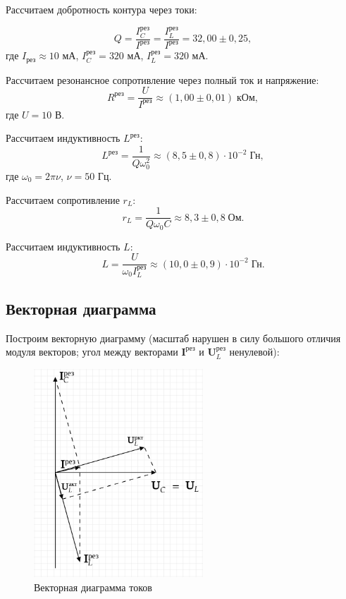 \documentclass[a4paper]{article}
\theoremstyle{definition}
\theoremstyle{remark}
\begin{document}
\noindent Рассчитаем добротность контура через токи:

$$Q = \frac{I_C^{\text{рез}}}{I^{\text{рез}}} = \frac{I_L^{\text{рез}}}{I^{\text{рез}}} = 32,00 \pm 0,25,$$ где $I_{\text{рез}} \approx 10$ мА, $I_C^{\text{рез}} = 320$ мА, $I_L^{\text{рез}} = 320$ мА. \medskip

\noindent Рассчитаем резонансное сопротивление через полный ток и напряжение: $$R^{\text{рез}} = \frac{U}{I^{\text{рез}}} \approx (1,00 \pm 0,01) \;\text{кОм},$$ где $U = 10$ В. \medskip


\noindent Рассчитаем индуктивность $L^{\text{рез}}$: $$L^{\text{рез}} = \frac{1}{Q\omega_0^2} \approx (8,5 \pm 0,8)\cdot 10^{-2} \;\text{Гн},$$ где $\omega_0 = 2\pi\nu$, $\nu = 50$ Гц. \medskip

\noindent Рассчитаем сопротивление $r_L$: $$r_L = \frac{1}{Q\omega_0 C} \approx 8,3 \pm 0,8 \;\text{Ом}.$$ \medskip

\noindent Рассчитаем индуктивность $L$: $$L = \frac{U}{\omega_0 I^{\text{рез}}_L} \approx (10,0 \pm 0,9) \cdot 10^{-2} \;\text{Гн}.$$

\subsection{Векторная диаграмма}

Построим векторную диаграмму (масштаб нарушен в силу большого отличия модуля векторов; угол между векторами $\mathbf{I}^{\text{рез}}$ и $\mathbf{U}_L^{\text{рез}}$ ненулевой):

\begin{figure}[h!]
    \centering
    \includegraphics[width = 180pt]{image/picture2.png}
    \caption{Векторная диаграмма токов}
\end{figure}
\end{document}
